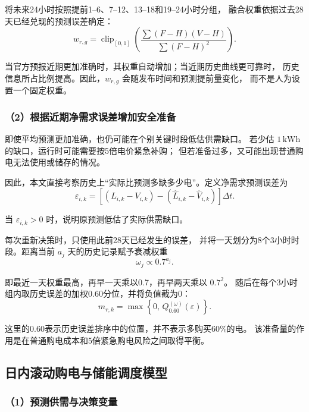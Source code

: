 将未来24小时按照提前1--6、7--12、13--18和19--24小时分组，
融合权重依据过去28天已经兑现的预测误差确定：
\begin{equation}
w_{r,g}
=
\operatorname{clip}_{[0,1]}
\left(
\frac{
\sum (F-H)(V-H)
}{
\sum (F-H)^2
}
\right).
\end{equation}

当官方预报近期更加准确时，其权重自动增加；当近期历史曲线更可靠时，
历史信息所占比例提高。因此，$w_{r,g}$ 会随发布时间和预测提前量变化，
而不是人为设置一个固定权重。


\subsubsection*{（2）根据近期净需求误差增加安全准备}

即使平均预测更加准确，也仍可能在个别关键时段低估供需缺口。
若少估 $1\,\mathrm{kWh}$ 的缺口，运行时可能需要按5倍电价紧急补购；
但若准备过多，又可能出现普通购电无法使用或储存的情况。

因此，本文直接考察历史上“实际比预测多缺多少电”。定义净需求预测误差为
\begin{equation}
\varepsilon_{i,k}
=
\left[
(L_{i,k}-V_{i,k})
-
(\widehat{L}_{i,k}-\widehat{V}_{i,k})
\right]\Delta t.
\end{equation}

当 $\varepsilon_{i,k}>0$ 时，说明原预测低估了实际供需缺口。

每次重新决策时，只使用此前28天已经发生的误差，
并将一天划分为8个3小时时段。距离当前 $a_j$ 天的历史记录赋予衰减权重
\begin{equation}
\omega_j
\propto
0.7^{a_j}.
\end{equation}

即最近一天权重最高，再早一天乘以0.7，再早两天乘以 $0.7^2$。
随后在每个3小时组内取历史误差的加权0.60分位，并将负值截为0：
\begin{equation}
m_{r,k}
=
\max
\left\{
0,\,
Q_{0.60}^{(\omega)}(\varepsilon)
\right\}.
\end{equation}

这里的0.60表示历史误差排序中的位置，并不表示多购买60\%的电。
该准备量的作用是在普通购电成本和5倍紧急购电风险之间取得平衡。


\subsection{日内滚动购电与储能调度模型}

\subsubsection*{（1）预测供需与决策变量}

